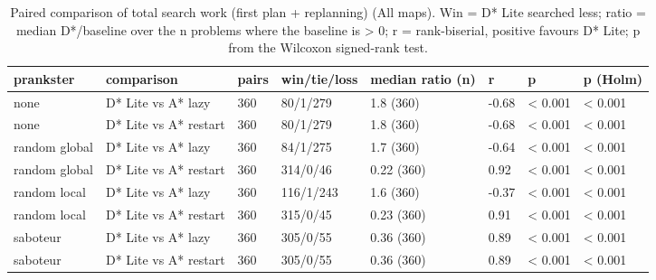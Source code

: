 \begin{table}[t]
\centering
\small
\caption{Paired comparison of total search work (first plan + replanning) (All maps). Win = D* Lite searched less; ratio = median D*/baseline over the n problems where the baseline is > 0; r = rank-biserial, positive favours D* Lite; p from the Wilcoxon signed-rank test.}
\label{tab:tests-total-all}
\begin{tabular}{llllllll}
\toprule
prankster & comparison & pairs & win/tie/loss & median ratio (n) & r & p & p (Holm) \\
\midrule
none & D* Lite vs A* lazy & 360 & 80/1/279 & 1.8 (360) & -0.68 & < 0.001 & < 0.001 \\
none & D* Lite vs A* restart & 360 & 80/1/279 & 1.8 (360) & -0.68 & < 0.001 & < 0.001 \\
random global & D* Lite vs A* lazy & 360 & 84/1/275 & 1.7 (360) & -0.64 & < 0.001 & < 0.001 \\
random global & D* Lite vs A* restart & 360 & 314/0/46 & 0.22 (360) & 0.92 & < 0.001 & < 0.001 \\
random local & D* Lite vs A* lazy & 360 & 116/1/243 & 1.6 (360) & -0.37 & < 0.001 & < 0.001 \\
random local & D* Lite vs A* restart & 360 & 315/0/45 & 0.23 (360) & 0.91 & < 0.001 & < 0.001 \\
saboteur & D* Lite vs A* lazy & 360 & 305/0/55 & 0.36 (360) & 0.89 & < 0.001 & < 0.001 \\
saboteur & D* Lite vs A* restart & 360 & 305/0/55 & 0.36 (360) & 0.89 & < 0.001 & < 0.001 \\
\bottomrule
\end{tabular}
\end{table}
